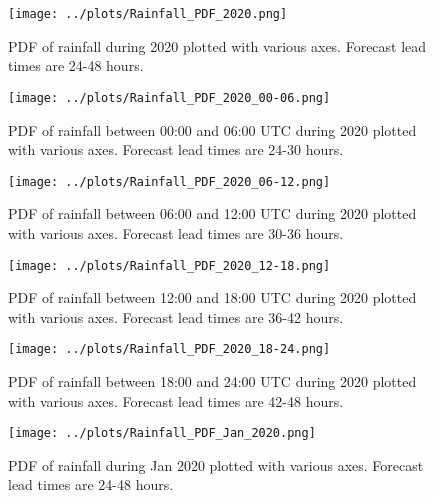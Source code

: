\documentclass[12pt]{article}
\begin{document}

\begin{figure}
\begin{center}
\texttt{[image: ../plots/Rainfall\_PDF\_2020.png]}
\end{center}
\caption{PDF of rainfall during 2020 plotted with various axes. Forecast lead times are 24-48 hours.}
\end{figure}

\begin{figure}
\begin{center}
\texttt{[image: ../plots/Rainfall\_PDF\_2020\_00-06.png]}
\end{center}
\caption{PDF of rainfall between 00:00 and 06:00 UTC during 2020 plotted with various axes. Forecast lead times are 24-30 hours.}
\end{figure}

\begin{figure}
\begin{center}
\texttt{[image: ../plots/Rainfall\_PDF\_2020\_06-12.png]}
\end{center}
\caption{PDF of rainfall between 06:00 and 12:00 UTC during 2020 plotted with various axes. Forecast lead times are 30-36 hours.}
\end{figure}

\begin{figure}
\begin{center}
\texttt{[image: ../plots/Rainfall\_PDF\_2020\_12-18.png]}
\end{center}
\caption{PDF of rainfall between 12:00 and 18:00 UTC during 2020 plotted with various axes. Forecast lead times are 36-42 hours.}
\end{figure}

\begin{figure}
\begin{center}
\texttt{[image: ../plots/Rainfall\_PDF\_2020\_18-24.png]}
\end{center}
\caption{PDF of rainfall between 18:00 and 24:00 UTC during 2020 plotted with various axes. Forecast lead times are 42-48 hours.}
\end{figure}

\begin{figure}
\begin{center}
\texttt{[image: ../plots/Rainfall\_PDF\_Jan\_2020.png]}
\end{center}
\caption{PDF of rainfall during Jan 2020 plotted with various axes. Forecast lead times are 24-48 hours.}
\end{figure}
\end{document}
